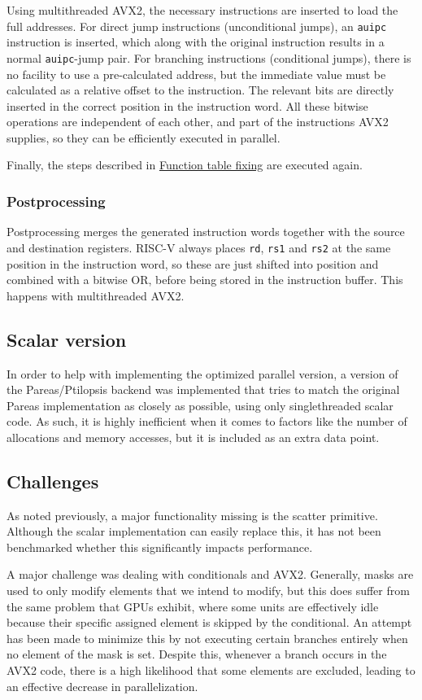 \documentclass[12pt,dvipsnames]{article}
\newcommand{\mono}[1]{\texttt{#1}}
\begin{document}
Using multithreaded AVX2, the necessary instructions are inserted to load the full addresses. For direct jump instructions (unconditional jumps), an \mono{auipc} instruction is inserted, which along with the original instruction results in a normal \mono{auipc}-jump pair. For branching instructions (conditional jumps), there is no facility to use a pre-calculated address, but the immediate value must be calculated as a relative offset to the instruction. The relevant bits are directly inserted in the correct position in the instruction word. All these bitwise operations are independent of each other, and part of the instructions AVX2 supplies, so they can be efficiently executed in parallel.

Finally, the steps described in \hyperref[functab]{Function table fixing} are executed again.

\subsubsection{Postprocessing}
Postprocessing merges the generated instruction words together with the source and destination registers. RISC-V always places \mono{rd}, \mono{rs1} and \mono{rs2} at the same position in the instruction word, so these are just shifted into position and combined with a bitwise OR, before being stored in the instruction buffer. This happens with multithreaded AVX2.

\subsection{Scalar version}
In order to help with implementing the optimized parallel version, a version of the Pareas/Ptilopsis backend was implemented that tries to match the original Pareas implementation as closely as possible, using only singlethreaded scalar code. As such, it is highly inefficient when it comes to factors like the number of allocations and memory accesses, but it is included as an extra data point.

\subsection{Challenges}
As noted previously, a major functionality missing is the scatter primitive. Although the scalar implementation can easily replace this, it has not been benchmarked whether this significantly impacts performance. 

A major challenge was dealing with conditionals and AVX2. Generally, masks are used to only modify elements that we intend to modify, but this does suffer from the same problem that GPUs exhibit, where some units are effectively idle because their specific assigned element is skipped by the conditional. An attempt has been made to minimize this by not executing certain branches entirely when no element of the mask is set. Despite this, whenever a branch occurs in the AVX2 code, there is a high likelihood that some elements are excluded, leading to an effective decrease in parallelization.
\end{document}
